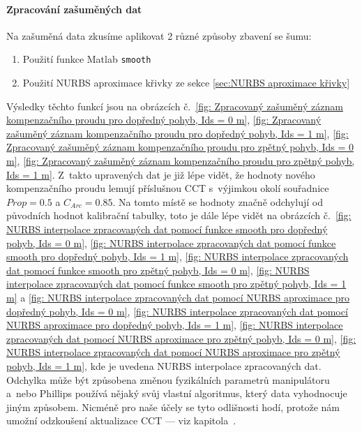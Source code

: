 \paragraph{Zpracování zašuměných dat}
Na zašuměná data zkusíme aplikovat 2 různé způsoby zbavení se šumu:
\begin{enumerate}
    \item Použití funkce Matlab \texttt{smooth}
    \item Použití NURBS aproximace křivky ze sekce \ref{sec:NURBS aproximace křivky}
\end{enumerate}
Výsledky těchto funkcí jsou na obrázcích č.~\ref{fig: Zpracovaný zašuměný záznam kompenzačního proudu pro dopředný pohyb, Ids = 0 m}, \ref{fig: Zpracovaný zašuměný záznam kompenzačního proudu pro dopředný pohyb, Ids = 1 m}, \ref{fig: Zpracovaný zašuměný záznam kompenzačního proudu pro zpětný pohyb, Ids = 0 m}, \ref{fig: Zpracovaný zašuměný záznam kompenzačního proudu pro zpětný pohyb, Ids = 1 m}. Z~takto upravených dat je již lépe vidět, že hodnoty nového kompenzačního proudu lemují příslušnou CCT s~výjimkou okolí souřadnice $Prop = 0.5$ a $C_{Arc} = 0.85$. Na tomto místě se hodnoty značně odchylují od původních hodnot kalibrační tabulky, toto je dále lépe vidět na obrázcích č.~\ref{fig: NURBS interpolace zpracovaných dat pomocí funkce smooth pro dopředný pohyb, Ids = 0 m}, \ref{fig: NURBS interpolace zpracovaných dat pomocí funkce smooth pro dopředný pohyb, Ids = 1 m}, \ref{fig: NURBS interpolace zpracovaných dat pomocí funkce smooth pro zpětný pohyb, Ids = 0 m}, \ref{fig: NURBS interpolace zpracovaných dat pomocí funkce smooth pro zpětný pohyb, Ids = 1 m} a \ref{fig: NURBS interpolace zpracovaných dat pomocí NURBS aproximace pro dopředný pohyb, Ids = 0 m}, \ref{fig: NURBS interpolace zpracovaných dat pomocí NURBS aproximace pro dopředný pohyb, Ids = 1 m}, \ref{fig: NURBS interpolace zpracovaných dat pomocí NURBS aproximace pro zpětný pohyb, Ids = 0 m}, \ref{fig: NURBS interpolace zpracovaných dat pomocí NURBS aproximace pro zpětný pohyb, Ids = 1 m}, kde je uvedena NURBS interpolace zpracovaných dat. Odchylka může být způsobena změnou fyzikálních parametrů manipulátoru a~nebo Phillips používá nějaký svůj vlastní algoritmus, který data vyhodnocuje jiným způsobem. Nicméně pro naše účely se tyto odlišnosti hodí, protože nám umožní odzkoušení aktualizace CCT --- viz kapitola~.

